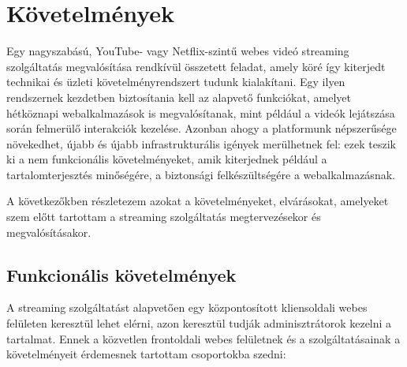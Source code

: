 \chapter{Követelmények}

Egy nagyszabású, YouTube- vagy Netflix-szintű webes videó streaming szolgáltatás megvalósítása rendkívül összetett feladat, amely köré így kiterjedt technikai és üzleti követelményrendszert tudunk kialakítani. Egy ilyen rendszernek kezdetben biztosítania kell az alapvető funkciókat, amelyet hétköznapi webalkalmazások is megvalósítanak, mint például a videók lejátszása során felmerülő interakciók kezelése. Azonban ahogy a platformunk népszerűsége növekedhet, újabb és újabb infrastrukturális igények merülhetnek fel: ezek teszik ki a nem funkcionális követelményeket, amik kiterjednek például a tartalomterjesztés minőségére, a biztonsági felkészültségére a webalkalmazásnak.

A következőkben részletezem azokat a követelményeket, elvárásokat, amelyeket szem előtt tartottam a streaming szolgáltatás megtervezésekor és megvalósításakor.

\section{Funkcionális követelmények}

A streaming szolgáltatást alapvetően egy központosított kliensoldali webes felületen keresztül lehet elérni, azon keresztül tudják adminisztrátorok kezelni a tartalmat. Ennek a közvetlen frontoldali webes felületnek és a szolgáltatásainak a követelményeit érdemesnek tartottam csoportokba szedni:

